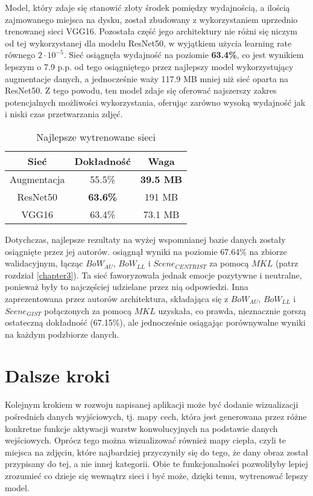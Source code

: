 Model, który zdaje się stanowić złoty środek pomiędzy wydajnością, a ilością zajmowanego miejsca na dysku, został zbudowany z wykorzystaniem uprzednio trenowanej sieci VGG16. Pozostała część jego architektury nie różni się niczym od tej wykorzystanej dla modelu ResNet50, w wyjątkiem użycia learning rate równego $2\cdot10^{-5}$. Sieć osiągnęła wydajność na poziomie \textbf{63.4\%}, co jest wynikiem lepszym o 7.9 p.p. od tego osiągniętego przez najlepszy model wykorzystujący augmentacje danych, a jednocześnie waży 117.9 MB mniej niż sieć oparta na ResNet50. Z tego powodu, ten model zdaje się oferować najszerszy zakres potencjalnych możliwości wykorzystania, oferując zarówno wysoką wydajność jak i niski czas przetwarzania zdjęć.

\begin{table}[H]
  \centering
  \caption{Najlepsze wytrenowane sieci}
    \begin{tabular}{ |c|c|c| }
    \hline
    Sieć & Dokładność & Waga \\
    \hline
    Augmentacja & 55.5\% & \textbf{39.5 MB} \\
    ResNet50 & \textbf{63.6\%} & 191 MB \\
    VGG16 & 63.4\% & 73.1 MB \\ 
    \hline
    \end{tabular}
  \label{tab:7.1}
\end{table}

Dotychczas, najlepsze rezultaty na wyżej wspomnianej bazie danych zostały osiągnięte przez jej autorów. \cite{GAD} osiągnął wyniki na poziomie 67.64\% na zbiorze walidacyjnym, łącząc $BoW_{AU}$, $BoW_{LL}$ i $Scene_{CENTRIST}$ za pomocą $MKL$ (patrz rozdział \ref{chapter3}). Ta sieć faworyzowała jednak emocje pozytywne i neutralne, ponieważ były to najczęściej udzielane przez nią odpowiedzi. Inna zaprezentowana przez autorów architektura, składająca się z $BoW_{AU}$, $BoW_{LL}$ i $Scene_{GIST}$ połączonych za pomocą $MKL$ uzyskała, co prawda, nieznacznie gorszą ostateczną dokładność (67.15\%), ale jednocześnie osiągając porównywalne wyniki na każdym podzbiorze danych.


\section{Dalsze kroki}
Kolejnym krokiem w rozwoju napisanej aplikacji może być dodanie wizualizacji pośrednich danych wyjściowych, tj. mapy cech, która jest generowana przez różne konkretne funkcje aktywacji warstw konwolucyjnych na podstawie danych wejściowych. Oprócz tego można wizualizować również mapy ciepła, czyli te miejsca na zdjęciu, które najbardziej przyczyniły się do tego, że dany obraz został przypisany do tej, a nie innej kategorii. Obie te funkcjonalności pozwoliłyby lepiej zrozumieć co dzieje się wewnątrz sieci i być może, dzięki temu, wytrenować lepszy model.

